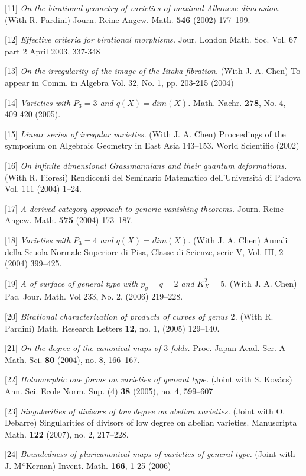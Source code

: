 \documentclass[12pt] {amsart}
\begin{document}
[11] {\it On the birational geometry of varieties of maximal Albanese 
dimension.} (With R. Pardini) Journ. Reine Angew. Math. {\bf 546} (2002) 177--199. 

[12] {\it Effective criteria for birational morphisms.}
Jour. London Math. Soc. Vol. 67 part 2 April 2003, 337-348

[13] {\it On the irregularity of the image of the Iitaka fibration.}
(With J. A. Chen) To appear in Comm. in Algebra Vol. 32, No. 1, pp. 203-215
(2004)

[14] {\it Varieties with $P_3=3$ and $q(X)=dim (X)$.}
Math. Nachr. {\bf 278}, No. 4, 409-420 (2005).

[15] {\it Linear series of irregular varieties.} (With J. A. Chen)
Proceedings  of the symposium
on Algebraic Geometry in East Asia 143--153. World Scientific (2002)

[16] 
{\it On infinite dimensional Grassmannians and their quantum deformations.}
(With R. Fioresi) Rendiconti del Seminario Matematico
dell'Universit\'a di Padova Vol. 111 (2004) 1--24. 


[17] {\it A derived category approach to generic vanishing theorems.}
Journ. Reine Angew. Math. {\bf 575} (2004) 173--187. 


[18] {\it Varieties with $P_3=4$ and $q(X)=dim (X)$.}
(With J. A. Chen) Annali della Scuola Normale Superiore 
di Pisa, Classe di Scienze, serie V, Vol. III, 2 (2004) 399--425.


[19] {\it A of surface of general type with
$p_g=q=2$ and $K_X^2=5$}. (With J. A. Chen) Pac. Jour. Math. Vol 233, No. 2,
(2006) 219--228.


[20] {\it Birational characterization of products of curves
of genus $2$.}
(With R. Pardini) Math. Research Letters {\bf 12}, no. 1, (2005) 129--140.



[21] {\it On the degree of the canonical maps of $3$-folds.}
 Proc. Japan Acad. Ser. A Math. Sci.  {\bf 80}  (2004),  no. 8, 166--167.
 
[22] {\it Holomorphic one forms on varieties of general type.}
(Joint with S. Kov\'acs) Ann. Sci. Ecole Norm. Sup. (4) {\bf 38}  (2005),  no. 4, 599--607

[23] {\it Singularities of divisors of low degree on abelian varieties.}
(Joint with O. Debarre) Singularities of divisors of low degree on abelian varieties.  Manuscripta Math.  {\bf 122}  (2007),  no. 2, 217--228.

[24] {\it Boundedness of pluricanonical maps of varieties of general type.}
(Joint with J. M$^{\rm{c}}$Kernan) Invent. Math. {\bf  166}, 1-25 (2006)
\end{document}
